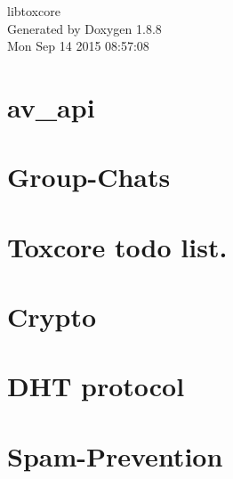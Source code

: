 \documentclass[twoside]{book}
\newcommand{\+}{\discretionary{\mbox{\scriptsize$\hookleftarrow$}}{}{}}
\newcommand{\clearemptydoublepage}{%
  \newpage{\pagestyle{empty}\cleardoublepage}%
}
\begin{document}
\hypersetup{pageanchor=false,
             bookmarks=true,
             bookmarksnumbered=true,
             pdfencoding=unicode
            }
\begin{titlepage}
\vspace*{7cm}
\begin{center}%
{\Large libtoxcore }\\
\vspace*{1cm}
{\large Generated by Doxygen 1.8.8}\\
\vspace*{0.5cm}
{\small Mon Sep 14 2015 08:57:08}\\
\end{center}
\end{titlepage}
\clearemptydoublepage
\tableofcontents
\clearemptydoublepage
{}
\hypersetup{pageanchor=true}

\chapter{av\+\_\+api}
\label{md_docs_av_api}
\hypertarget{md_docs_av_api}{}

\chapter{Group-\/\+Chats}
\label{md_docs__group-_chats}
\hypertarget{md_docs__group-_chats}{}

\chapter{Toxcore todo list.}
\label{md_docs__t_o_d_o}
\hypertarget{md_docs__t_o_d_o}{}

\chapter{Crypto}
\label{md_docs_updates__crypto}
\hypertarget{md_docs_updates__crypto}{}

\chapter{D\+H\+T protocol}
\label{md_docs_updates__d_h_t}
\hypertarget{md_docs_updates__d_h_t}{}

\chapter{Spam-\/\+Prevention}
\label{md_docs_updates__spam-_prevention}
\hypertarget{md_docs_updates__spam-_prevention}{}

\end{document}
